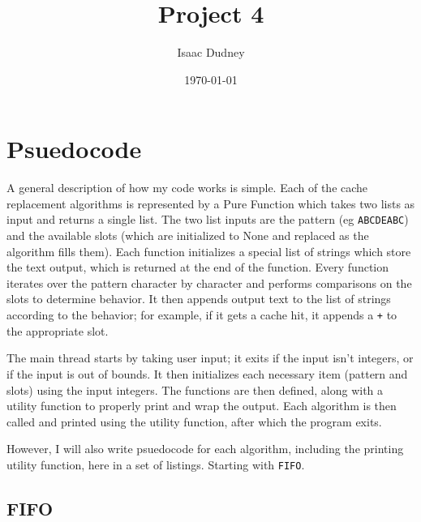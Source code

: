 \documentclass[11pt]{article}
\title{Project 4}
\author{Isaac Dudney}
\date{\today}
\begin{document}
\maketitle

\section{Psuedocode}

A general description of how my code works is simple.
Each of the cache replacement algorithms is represented by a Pure Function which takes two lists as input and returns a single list.
The two list inputs are the pattern (eg \texttt{ABCDEABC}) and the available slots (which are initialized to None and replaced as the algorithm fills them).
Each function initializes a special list of strings which store the text output, which is returned at the end of the function.
Every function iterates over the pattern character by character and performs comparisons on the slots to determine behavior.
It then appends output text to the list of strings according to the behavior; for example, if it gets a cache hit, it appends a \texttt{+} to the appropriate slot.

The main thread starts by taking user input; it exits if the input isn't integers, or if the input is out of bounds.
It then initializes each necessary item (pattern and slots) using the input integers.
The functions are then defined, along with a utility function to properly print and wrap the output.
Each algorithm is then called and printed using the utility function, after which the program exits.

However, I will also write psuedocode for each algorithm, including the printing utility function, here in a set of listings.
Starting with \texttt{FIFO}.

\subsection{FIFO}
\end{document}
